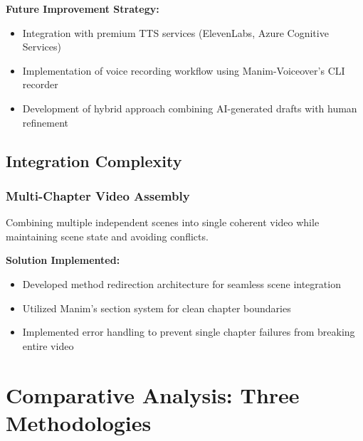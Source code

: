 \documentclass[12pt,a4paper]{article}
\begin{document}
\textbf{Future Improvement Strategy:}
\begin{itemize}
    \item Integration with premium TTS services (ElevenLabs, Azure Cognitive Services)
    \item Implementation of voice recording workflow using Manim-Voiceover's CLI recorder
    \item Development of hybrid approach combining AI-generated drafts with human refinement
\end{itemize}

\subsection{Integration Complexity}

\subsubsection{Multi-Chapter Video Assembly}
\begin{tcolorbox}[colback=red!5!white,colframe=red!75!black,title=Challenge]
Combining multiple independent scenes into single coherent video while maintaining scene state and avoiding conflicts.
\end{tcolorbox}

\textbf{Solution Implemented:}
\begin{itemize}
    \item Developed method redirection architecture for seamless scene integration
    \item Utilized Manim's section system for clean chapter boundaries
    \item Implemented error handling to prevent single chapter failures from breaking entire video
\end{itemize}

\section{Comparative Analysis: Three Methodologies}
\end{document}
